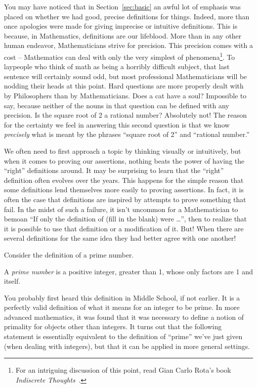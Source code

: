 You may have noticed that in Section~\ref{sec:basic} an awful lot of
emphasis was placed on whether we had good, precise definitions
for things.  Indeed, more than once apologies were made for giving
imprecise or intuitive definitions.  This is because, in Mathematics,
definitions are our lifeblood.  More than in any other human 
endeavor, Mathematicians strive for precision.  This precision
comes with a cost -- Mathematics can deal with only the very 
simplest of phenomena\footnote{For an intriguing discussion of this 
point, read Gian Carlo Rota's book {\em Indiscrete Thoughts}~\cite{rota}.}.  
To laypeople who think of math as being
a horribly difficult subject, that last sentence will certainly 
sound odd, but most professional Mathematicians will be nodding 
their heads at this point.  Hard questions are more properly dealt 
with by Philosophers than by Mathematicians.  Does a cat have 
a soul?  Impossible
to say, because neither of the nouns in that question can be 
defined with any precision.  Is the square root of 2 a rational number?
Absolutely not!  The reason
for the certainty we feel in answering this second question is
that we know {\em precisely} what is meant by the phrases 
``square root of 2'' and ``rational number.''

We often need to first approach
a topic by thinking visually or intuitively, but when it comes to
proving our assertions, nothing beats the power of having the
``right'' definitions around.  It may be surprising to learn that
the ``right'' definition often evolves over the years.  This 
happens for the simple reason that some definitions lend themselves
more easily to proving assertions.  In fact, it is often the case
that definitions are inspired by attempts to prove something that 
fail.  In the midst of such a failure, it isn't uncommon for a 
Mathematician to bemoan ``If only the definition of (fill in the 
blank) were \ldots'', then to realize that it is possible to
use that definition or a modification of it.  But! When there are 
several definitions
for the same idea they had better agree with one another!  

Consider the definition of a prime number. 

\begin{defi} 
A {\em prime number} is a positive integer,
greater than 1, whose only factors are 1 and itself.
\end{defi}

You probably first heard this definition in Middle School, if not
earlier.  It is a perfectly valid definition of what it means 
for an integer to be prime.  In more advanced mathematics, it
was found that it was necessary to define a notion of primality
for objects other than integers.  It turns out that the following
statement is essentially equivalent to the definition of ``prime'' we've just
given (when dealing with integers), but that it can be applied in 
more general settings.

